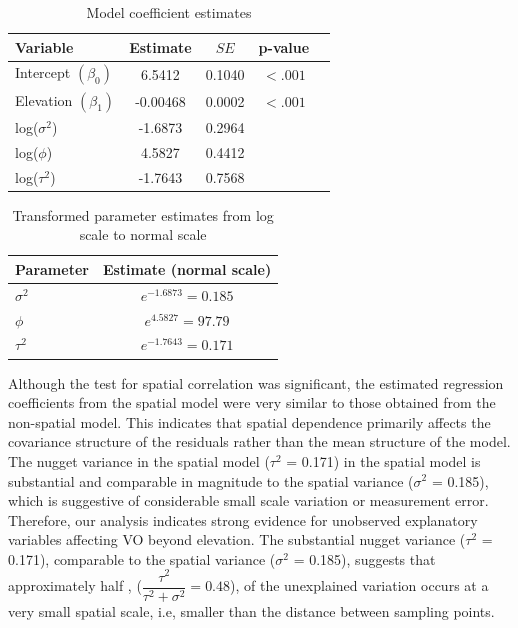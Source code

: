 \documentclass[12pt]{article}
\begin{document}
\begin{table}[htbp]
\centering
\caption{Model coefficient estimates}
\begin{tabular}{lcccc}
\hline
Variable & Estimate & $SE$ & p-value \\
\hline
Intercept $(\beta_0)$ & 6.5412  & 0.1040  & $<.001$ \\
Elevation $(\beta_1)$ & -0.00468 & 0.0002  & $<.001$ \\
log($\sigma^2$) & -1.6873 & 0.2964 & & \\
log($\phi$) & 4.5827 &0.4412 & & \\
log($\tau^2$) & -1.7643 & 0.7568 & & \\
\hline
\end{tabular}
\end{table}




\begin{table}[h!]
\centering
\caption{Transformed parameter estimates from log scale to normal scale}
\begin{tabular}{lc}
\hline
Parameter & Estimate (normal scale) \\
\hline
$\sigma^2$ & $e^{-1.6873} = 0.185$ \\
$\phi$     & $e^{4.5827} = 97.79$ \\
$\tau^2$   & $e^{-1.7643} = 0.171$ \\
\hline
\end{tabular}
\end{table}

\noindent Although the test for spatial correlation was significant, the estimated regression coefficients from the spatial model were very similar to those obtained from the non-spatial model. This indicates that spatial dependence primarily affects the covariance structure of the residuals rather than the mean structure of the model. The nugget variance in the spatial model ($\tau^2$ = 0.171) in the spatial model is substantial and comparable in magnitude to the spatial variance ($\sigma^2$ = 0.185), which is suggestive of considerable small scale variation or measurement error. Therefore, our analysis indicates strong evidence for unobserved explanatory variables affecting VO beyond elevation. The substantial nugget variance ($\tau^2$ = 0.171), comparable to the spatial variance ($\sigma^2$ = 0.185), suggests that approximately half , \big($\dfrac{\tau^2}{\tau^2 + \sigma^2}=0.48 $\big), of the unexplained variation  occurs at a very small spatial scale, i.e, smaller than the distance between sampling points.
\end{document}
